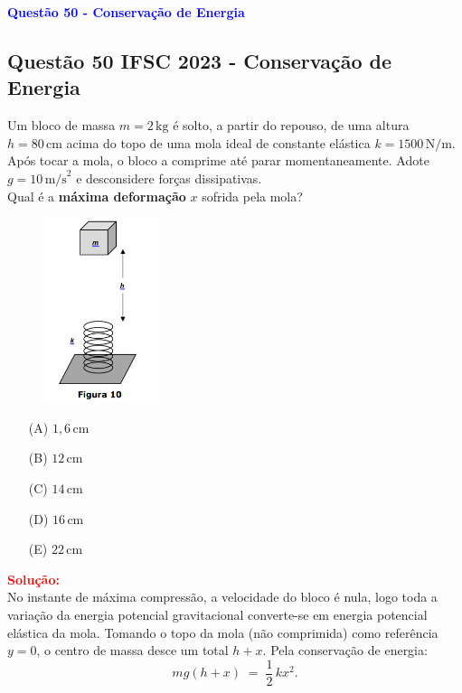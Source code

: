 \begin{flushleft}
\textbf{\textcolor{blue}{\Large Quest\~ao 50 - Conservação de Energia}}\\
\noindent

\subsection{Quest\~ao 50 IFSC 2023 - Conservação de Energia}

Um bloco de massa $m=2\,\text{kg}$ é solto, a partir do repouso, de uma altura $h=80\,\text{cm}$ acima do topo de uma mola ideal de constante elástica $k=1500\,\text{N/m}$. Após tocar a mola, o bloco a comprime até parar momentaneamente. Adote $g=10\,\text{m/s}^2$ e desconsidere forças dissipativas.\\
Qual é a \textbf{máxima deformação} $x$ sofrida pela mola?

\begin{figure}[!h]
\centering
\includegraphics[width=0.3\textwidth]{figures/bloco_queda_livre.png} 
\end{figure}

\begin{itemize}
\item[(A)] $1{,}6\,\text{cm}$
\item[(B)] $12\,\text{cm}$
\item[(C)] $14\,\text{cm}$
\item[(D)] $16\,\text{cm}$
\item[(E)] $22\,\text{cm}$
\end{itemize}

\vspace{0.5cm}

\textcolor{red}{\textbf{Solução:}}\\

No instante de máxima compressão, a velocidade do bloco é nula, logo toda a variação da energia potencial gravitacional converte-se em energia potencial elástica da mola. Tomando o topo da mola (não comprimida) como referência $y=0$, o centro de massa desce um total $h+x$. Pela conservação de energia:
\[
m g (h+x) \;=\; \frac{1}{2}\,k x^2.
\]


\end{flushleft}

